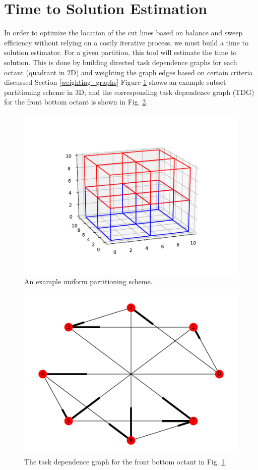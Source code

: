 \documentclass[11pt, letterpaper,titlepage,oneside]{article}
\begin{document}
\section{Time to Solution Estimation} \label{TOS}

In order to optimize the location of the cut lines based on balance and sweep efficiency without relying on a costly iterative process, we must build a time to solution estimator. For a given partition, this tool will estimate the time to solution. This is done by building directed task dependence graphs for each octant (quadrant in 2D) and weighting the graph edges based on certain criteria discussed Section \ref{weighting_graphs} Figure \ref{subset_plot} shows an example subset partitioning scheme in 3D, and the corresponding task dependence graph (TDG) for the front bottom octant is shown in Fig. \ref{digraph}.

\begin{figure}[H]
\centering
\includegraphics{../figures/subset_plot.pdf}
\caption{An example uniform partitioning scheme.}
\label{subset_plot}
\end{figure}

\begin{figure}[H]
\centering
\includegraphics{../figures/digraph.pdf}
\caption{The task dependence graph for the front bottom octant in Fig. \ref{subset_plot}.}
\label{digraph}
\end{figure}
\end{document}
